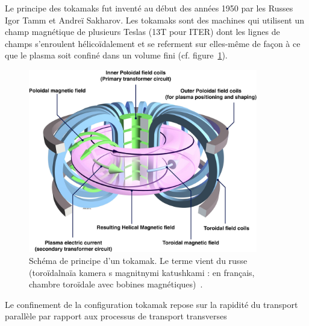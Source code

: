 \begin{refsection}
Le principe des tokamaks fut inventé au début des années 1950 par les Russes Igor Tamm et
Andreï Sakharov. Les tokamaks sont des machines qui utilisent
un champ magnétique de plusieurs Teslas (13T pour ITER) dont les lignes de
champs s'enroulent hélicoïdalement et se referment sur elles-même de façon à ce que le plasma soit
confiné dans un volume fini (cf. figure~\ref{tokamak}).
\begin{figure}[!htbp]
    \centering
	\includegraphics[height=80mm]{figures/1-tokamak.jpg}
	\caption{Schéma de principe d'un tokamak. Le terme vient du
russe (toroïdalnaïa kamera s magnitnymi katushkami : en français, chambre toroïdale avec bobines
magnétiques)~\parencite{efda}.}\label{tokamak}
\end{figure}

Le confinement de la configuration tokamak repose sur la rapidité du transport
parallèle par rapport aux processus de transport transverses
\end{refsection}
